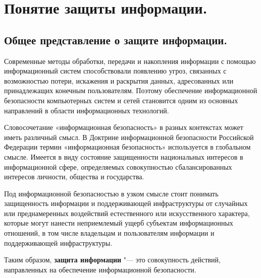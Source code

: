 \section{Понятие защиты информации.}
\subsection{Общее представление о защите информации.}
Современные методы обработки, передачи и накопления информации с помощью информационный систем способствовали 
появлению угроз, связанных с возможностью потери, искажения и раскрытия данных, адресованных или принадлежащих 
конечным пользователям. Поэтому обеспечение информационной безопасности компьютерных систем и сетей становится 
одним из основных направлений в области информационных технологий.\cite{sh}

Словосочетание «информационная безопасность» в разных контекстах может иметь различный смысл. В Доктрине информационной
безопасности Российской Федерации термин «информационная безопасность» используется в глобальном смысле. Имеется в виду 
состояние защищенности национальных интересов в информационной сфере, определяемых совокупностью сбалансированных интересов 
личности, общества и государства. 

Под информационной безопасностью в узком смысле стоит понимать защищенность информации и поддерживающей инфраструктуры от 
случайных или преднамеренных воздействий естественного или искусственного характера, которые могут нанести неприемлемый ущерб 
субъектам информационных отношений, в том числе владельцам и пользователям информации и поддерживающей инфраструктуры. 

Таким образом, \textbf{защита информации} "---  это совокупность действий, направленных на обеспечение информационной безопасности.\cite{untuit}

